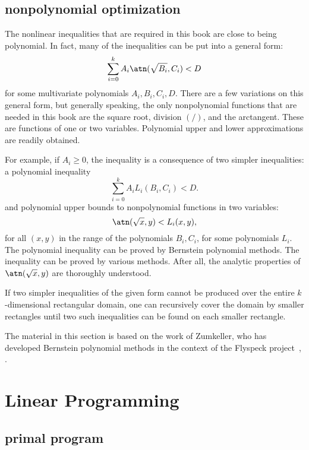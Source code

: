 \subsection{nonpolynomial optimization}

The nonlinear inequalities that are required in this book are close to
being polynomial.  In fact, many  of the inequalities can be put into a
general form:
\begin{equation}\label{eqn:ABCD}
\sum_{i=0}^k A_i \atn(\sqrt{B_i},C_i) < D
\end{equation}
for some multivariate polynomials $A_i,B_i,C_i,D$.  There are a few
variations on this general form, but generally speaking, the only
nonpolynomial functions that are needed in this book are the square
root, division $(/)$, and the arctangent.  These
are functions of one or two variables.  Polynomial upper and lower
approximations are readily obtained.

For example, if $A_i\ge 0$, the inequality  is a
consequence of two simpler inequalities: a polynomial inequality
\[
\sum_{i=0}^k A_i L_i(B_i,C_i) < D.
\]
and polynomial upper bounds to nonpolynomial functions in two variables:
\begin{equation}\label{eqn:sL}
\atn(\sqrt{x},y) < L_i(x,y),
\end{equation}
for all $(x,y)$ in the range of the polynomials $B_i,C_i$, for some
polynomials $L_i$.  The polynomial
inequality can be proved by Bernstein polynomial methods.  The
inequality  can be proved by various methods.  After all,
the analytic properties of $\atn(\sqrt{x},y)$ are thoroughly
understood.

If two simpler inequalities of the given form cannot be produced over
the entire $k$-dimensional rectangular domain, one can recursively
cover the domain by smaller rectangles until two such inequalities can
be found on each smaller rectangle.

The material in this section is based on the work of Zumkeller, who
has developed Bernstein polynomial methods in the context of the
Flyspeck project~\cite{roland-thesis}, \cite{zumkeller-nonlinear}.


\section{Linear Programming}\label{sec:lp}

\subsection{primal program}

